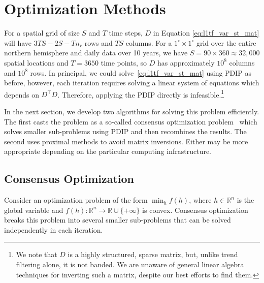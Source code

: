 \documentclass[letterpaper]{article} %
\begin{document}
\section{Optimization Methods}
\label{sec:prop-optim-meth}

For a spatial grid of size $S$ and $T$ time steps, $D$ in Equation
\eqref{eq:l1tf_var_st_mat} will have 
$3TS-2S-Tn_r$ rows and $TS$ columns. For a $1^\circ\times
1^\circ$ grid over the entire northern hemisphere and daily data over
10 years, we have $S=90\times 360\approx 32,000$ spatial locations and
$T=3650$ time points, so $D$ has
approximately $10^8$ columns and $10^8$ rows. In principal, we could
solve~\eqref{eq:l1tf_var_st_mat} using PDIP as before, however, each iteration
requires solving a linear system of equations which
depends on $D^\top D$. Therefore,
applying the PDIP directly is infeasible.\footnote{We
  note that $D$ is a highly structured, sparse matrix, but, unlike
  trend filtering alone, it is not banded. We are unaware of general
  linear algebra techniques for inverting such a matrix, despite our
  best efforts to find them.}  

In the next section, we develop two algorithms for solving this
problem efficiently. The first casts the problem as a
so-called consensus optimization problem~\cite{boyd_distributed_2011}
which solves smaller sub-problems using PDIP and then recombines the results. The
second uses proximal methods to avoid matrix inversions. Either may be more
appropriate depending on the particular computing infrastructure.
 

\subsection{Consensus Optimization}
\label{sec:consOpt}


Consider an optimization problem of the form $\min_h f(h)$, where
$h\in\mathbb{R}^n$ is the global variable and
$f(h):\mathbb{R}^n \rightarrow \mathbb{R}\cup \{+\infty\}$ is
convex. Consensus optimization breaks this problem
into several smaller sub-problems that can be solved independently in
each iteration.  
\end{document}
